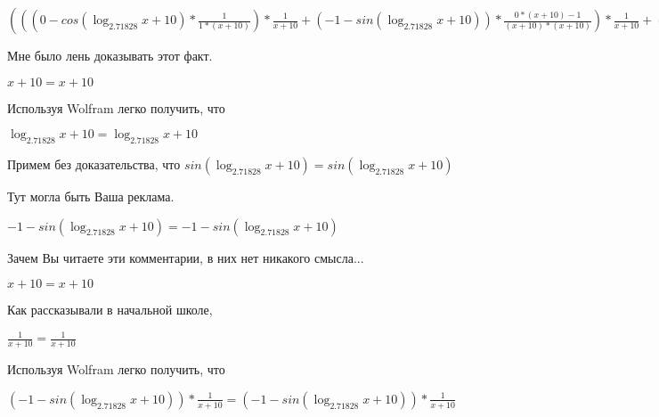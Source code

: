 \documentclass[12pt,a4paper,fleqn]{article}
\theoremstyle{definition}
\begin{document}
$((( 0  - cos(\log_{ 2.71828 }{ x  +  10 }) * \frac{ 1 }{ 1  * ( x  +  10 )}
) * \frac{ 1 }{ x  +  10 }
 + ( -1  - sin(\log_{ 2.71828 }{ x  +  10 })) * \frac{ 0  * ( x  +  10 ) -  1 }{( x  +  10 ) * ( x  +  10 )}
) * \frac{ 1 }{ x  +  10 }
 + ( -1  - sin(\log_{ 2.71828 }{ x  +  10 })) * \frac{ 1 }{ x  +  10 }
 * \frac{ 0  * ( x  +  10 ) -  1 }{( x  +  10 ) * ( x  +  10 )}
 + ( -1  - sin(\log_{ 2.71828 }{ x  +  10 })) * \frac{ 1 }{ 1  * ( x  +  10 )}
 * \frac{ -2 }{( x  +  10 ) * ( x  +  10 )}
 + cos(\log_{ 2.71828 }{ x  +  10 }) * \frac{ 0  * ( x  +  10 ) * ( x  +  10 ) -  -2  * ( 1  * ( x  +  10 ) + ( x  +  10 ) *  1 )}{( x  +  10 ) * ( x  +  10 ) * ( x  +  10 ) * ( x  +  10 )}
) * { 3 }^{sin(\log_{ 2.71828 }{ x  +  10 })} = ((( 0  - cos(\log_{ 2.71828 }{ x  +  10 }) * \frac{ 1 }{ 1  * ( x  +  10 )}
) * \frac{ 1 }{ x  +  10 }
 + ( -1  - sin(\log_{ 2.71828 }{ x  +  10 })) * \frac{ 0  * ( x  +  10 ) -  1 }{( x  +  10 ) * ( x  +  10 )}
) * \frac{ 1 }{ x  +  10 }
 + ( -1  - sin(\log_{ 2.71828 }{ x  +  10 })) * \frac{ 1 }{ x  +  10 }
 * \frac{ 0  * ( x  +  10 ) -  1 }{( x  +  10 ) * ( x  +  10 )}
 + ( -1  - sin(\log_{ 2.71828 }{ x  +  10 })) * \frac{ 1 }{ 1  * ( x  +  10 )}
 * \frac{ -2 }{( x  +  10 ) * ( x  +  10 )}
 + cos(\log_{ 2.71828 }{ x  +  10 }) * \frac{ 0  * ( x  +  10 ) * ( x  +  10 ) -  -2  * ( 1  * ( x  +  10 ) + ( x  +  10 ) *  1 )}{( x  +  10 ) * ( x  +  10 ) * ( x  +  10 ) * ( x  +  10 )}
) * { 3 }^{sin(\log_{ 2.71828 }{ x  +  10 })}$

Мне было лень доказывать этот факт.

$ x  +  10  =  x  +  10 $

Используя Wolfram легко получить, что

$\log_{ 2.71828 }{ x  +  10 } = \log_{ 2.71828 }{ x  +  10 }$

Примем без доказательства, что
$sin(\log_{ 2.71828 }{ x  +  10 }) = sin(\log_{ 2.71828 }{ x  +  10 })$

Тут могла быть Ваша реклама.

$ -1  - sin(\log_{ 2.71828 }{ x  +  10 }) =  -1  - sin(\log_{ 2.71828 }{ x  +  10 })$

Зачем Вы читаете эти комментарии, в них нет никакого смысла...

$ x  +  10  =  x  +  10 $

Как рассказывали в начальной школе,

$\frac{ 1 }{ x  +  10 }
 = \frac{ 1 }{ x  +  10 }
$

Используя Wolfram легко получить, что

$( -1  - sin(\log_{ 2.71828 }{ x  +  10 })) * \frac{ 1 }{ x  +  10 }
 = ( -1  - sin(\log_{ 2.71828 }{ x  +  10 })) * \frac{ 1 }{ x  +  10 }
$
\end{document}
